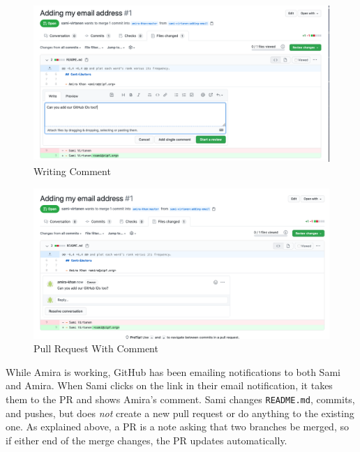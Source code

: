 \documentclass[
]{krantz}
\begin{document}
\begin{figure}

{\centering \includegraphics[width=1\linewidth]{figures/git-advanced/pr-writing-comment} 

}

\caption{Writing Comment}\label{fig:git-advanced-pull-request-write-comment}
\end{figure}

\begin{figure}

{\centering \includegraphics[width=1\linewidth]{figures/git-advanced/pr-with-comment} 

}

\caption{Pull Request With Comment}\label{fig:git-advanced-pull-request-pr-with-comment}
\end{figure}

While Amira is working,
GitHub has been emailing notifications to both Sami and Amira.
When Sami clicks on the link in their email notification,
it takes them to the PR and shows Amira's comment.
Sami changes \texttt{README.md},
commits,
and pushes,
but does \emph{not} create a new pull request or do anything to the existing one.
As explained above,
a PR is a note asking that two branches be merged,
so if either end of the merge changes,
the PR updates automatically.
\end{document}
